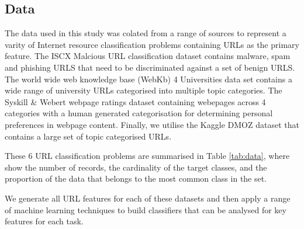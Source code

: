 \documentclass{aircc}
\begin{document}
\subsection{Data}
The data used in this study was colated from a range of sources to represent a varity of
Internet resource classification problems containing URLs as the primary feature.
The ISCX Malcious URL classification dataset contains malware, spam and phishing URLS
that need to be discriminated against a set of benign URLS\cite{Mamun2016}.
The world wide web knowledge base (WebKb) 4 Universities data set contains a wide
range of university URLs categorised into multiple topic categories\cite{Craven1998}.
The Syskill \& Webert webpage ratings dataset containing webepages across 4 categories
with a human generated categorisation for determining personal preferences in webpage
content\cite{Pazzani1996}. Finally, we utilise the Kaggle DMOZ dataset that contains
a large set of topic categorised URLs\cite{dmoz}.

These 6 URL classification problems are summarised in Table \ref{tab:data}, where
show the number of records, the cardinality of the target classes, and the proportion
of the data that belongs to the most common class in the set.

\begin{table}
\caption{Datasets}
\fontsize{3pt}{3pt}\selectfont
\label{tab:data}
\end{table}

We generate all URL features for each of these datasets and then apply a range of machine learning
techniques to build classifiers that can be analysed for key features for each task.
\end{document}
